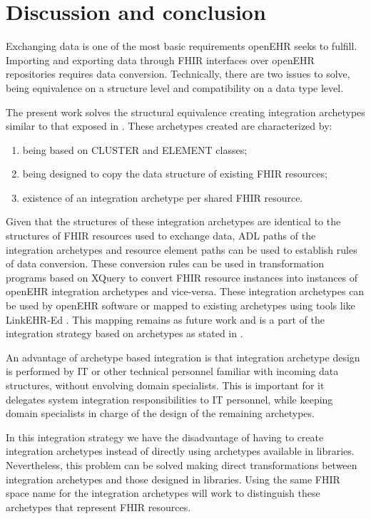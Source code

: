 \section{Discussion and conclusion}

Exchanging data is one of the most basic requirements openEHR seeks to fulfill. Importing and exporting data through FHIR interfaces over openEHR repositories requires data conversion. Technically, there are two issues to solve, being equivalence on a structure level and compatibility on a data type level.

The present work solves the structural equivalence creating integration archetypes similar to that exposed in \cite{openEHRArchitecture}. These archetypes created are characterized by:

\begin{enumerate}
  \item being based on CLUSTER and ELEMENT classes;
  \item being designed to copy the data structure of existing FHIR resources;
  \item existence of an integration archetype per shared FHIR resource.
\end{enumerate}

Given that the structures of these integration archetypes are identical to the structures of FHIR resources used to exchange data, ADL paths of the integration archetypes and resource element paths can be used to establish rules of data conversion. These conversion rules can be used in transformation programs based on XQuery to convert FHIR resource instances into instances of openEHR integration archetypes and vice-versa. These integration archetypes can be used by openEHR software or mapped to existing archetypes using tools like LinkEHR-Ed \cite{Maldonado09}. This mapping remains as future work and is a part of the integration strategy based on archetypes as stated in \cite{openEHRIntegration}.

An advantage of archetype based integration is that integration archetype design is performed by IT or other technical personnel familiar with incoming data structures, without envolving domain specialists. This is important for it delegates system integration responsibilities to IT personnel, while keeping domain specialists in charge of the design of the remaining archetypes.

In this integration strategy we have the disadvantage of having to create integration archetypes instead of directly using archetypes available in libraries. Nevertheless, this problem can be solved making direct transformations between integration archetypes and those designed in libraries. Using the same FHIR space name for the integration archetypes will work to distinguish these archetypes that represent FHIR resources.

